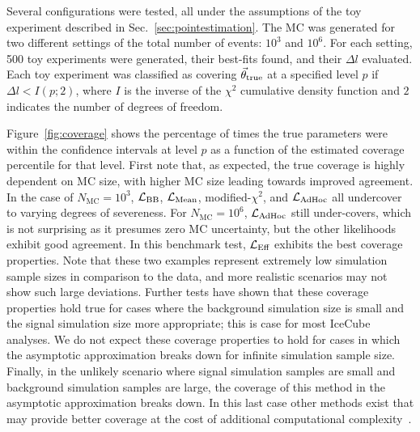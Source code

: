 Several configurations were tested, all under the assumptions of the toy experiment described in Sec.~\ref{sec:pointestimation}.
The MC was generated for two different settings of the total number of events: $10^3$ and $10^6$.
For each setting, 500 toy experiments were generated, their best-fits found, and their $\Delta l$ evaluated.
Each toy experiment was classified as covering $\vec{\theta}_{\rm true}$ at a specified level $p$ if $\Delta l < I(p;2)$, where $I$ is the inverse of the $\chi^2$ cumulative density function and $2$ indicates the number of degrees of freedom.

Figure~\ref{fig:coverage} shows the percentage of times the true parameters were within the confidence intervals at level $p$ as a function of the estimated coverage percentile for that level.
First note that, as expected, the true coverage is highly dependent on MC size, with higher MC size leading towards improved agreement.
In the case of $N_\mathrm{MC}=10^3$, $\mathcal{L}_{\textmd{BB}}$, $\mathcal{L}_{\textmd{Mean}}$, modified-$\chi^2$, and $\mathcal{L}_{\textmd{AdHoc}}$ all undercover to varying degrees of severeness.
For $N_\mathrm{MC}=10^6$, $\mathcal{L}_{\textmd{AdHoc}}$ still under-covers, which is not surprising as it presumes zero MC uncertainty, but the other likelihoods exhibit good agreement.
In this benchmark test, $\mathcal{L}_\textmd{Eff}$ exhibits the best coverage properties.
Note that these two examples represent extremely low simulation sample sizes in comparison to the data, and more realistic scenarios may not show such large deviations.
Further tests have shown that these coverage properties hold true for cases where the background simulation size is small and the signal simulation size more appropriate; this is case for most IceCube analyses.
We do not expect these coverage properties to hold for cases in which the asymptotic approximation breaks down for infinite simulation sample size.
Finally, in the unlikely scenario where signal simulation samples are small and background simulation samples are large, the coverage of this method in the asymptotic approximation breaks down.
In this last case other methods exist that may provide better coverage at the cost of additional computational complexity~\cite{Glusenkamp:2019uir}.

